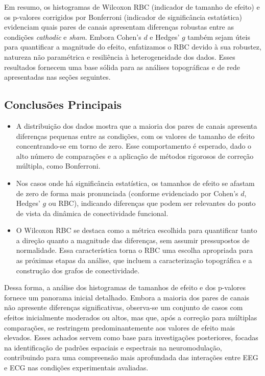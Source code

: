 Em resumo, os histogramas de Wilcoxon RBC (indicador de tamanho de efeito) e os p-valores corrigidos por Bonferroni (indicador de significância estatística) evidenciam quais pares de canais apresentam diferenças robustas entre as condições \textit{cathodic} e \textit{sham}. Embora Cohen's \(d\) e Hedges' \(g\)  também sejam úteis para quantificar a magnitude do efeito, enfatizamos o RBC devido à sua robustez, natureza não paramétrica e resiliência à heterogeneidade dos dados. Esses resultados fornecem uma base sólida para as análises topográficas e de rede apresentadas nas seções seguintes.

\subsection{Conclusões Principais}
\begin{itemize}
    \item A distribuição dos dados mostra que a maioria dos pares de canais apresenta diferenças pequenas entre as condições, com os valores de tamanho de efeito concentrando-se em torno de zero. Esse comportamento é esperado, dado o alto número de comparações e a aplicação de métodos rigorosos de correção múltipla, como Bonferroni.
    
    \item Nos casos onde há significância estatística, os tamanhos de efeito se afastam de zero de forma mais pronunciada (conforme evidenciado por Cohen's \(d\), Hedges' \(g\)  ou RBC), indicando diferenças que podem ser relevantes do ponto de vista da dinâmica de conectividade funcional.

    \item O Wilcoxon RBC se destaca como a métrica escolhida para quantificar tanto a direção quanto a magnitude das diferenças, sem assumir pressupostos de normalidade. Essa característica torna o RBC uma escolha apropriada para as próximas etapas da análise, que incluem a caracterização topográfica e a construção dos grafos de conectividade.

\end{itemize}

Dessa forma, a análise dos histogramas de tamanhos de efeito e dos p-valores fornece um panorama inicial detalhado. Embora a maioria dos pares de canais não apresente diferenças significativas, observa-se um conjunto de casos com efeitos inicialmente moderados ou altos, mas que, após a correção para múltiplas comparações, se restringem predominantemente aos valores de efeito mais elevados. Esses achados servem como base para investigações posteriores, focadas na identificação de padrões espaciais e espectrais na neuromodulação, contribuindo para uma compreensão mais aprofundada das interações entre EEG e ECG nas condições experimentais avaliadas.